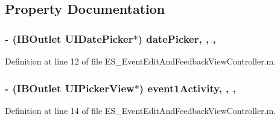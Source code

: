 \subsection{Property Documentation}
\hypertarget{category_e_s___event_edit_and_feedback_view_controller_07_08_a7ca843439ff111957ef6803b44746743}{
\subsubsection[{date\+Picker}]{\setlength{\rightskip}{0pt plus 5cm}-\/ (I\+B\+Outlet U\+I\+Date\+Picker$\ast$) date\+Picker\hspace{0.3cm}{\ttfamily [read]}, {\ttfamily [write]}, {\ttfamily [nonatomic]}, {\ttfamily [weak]}}}\label{category_e_s___event_edit_and_feedback_view_controller_07_08_a7ca843439ff111957ef6803b44746743}


Definition at line 12 of file E\+S\+\_\+\+Event\+Edit\+And\+Feedback\+View\+Controller.\+m.

\hypertarget{category_e_s___event_edit_and_feedback_view_controller_07_08_a0715a782decc6380aa28960d643b16d5}{
\subsubsection[{event1\+Activity}]{\setlength{\rightskip}{0pt plus 5cm}-\/ (I\+B\+Outlet U\+I\+Picker\+View$\ast$) event1\+Activity\hspace{0.3cm}{\ttfamily [read]}, {\ttfamily [write]}, {\ttfamily [nonatomic]}, {\ttfamily [weak]}}}\label{category_e_s___event_edit_and_feedback_view_controller_07_08_a0715a782decc6380aa28960d643b16d5}


Definition at line 14 of file E\+S\+\_\+\+Event\+Edit\+And\+Feedback\+View\+Controller.\+m.

